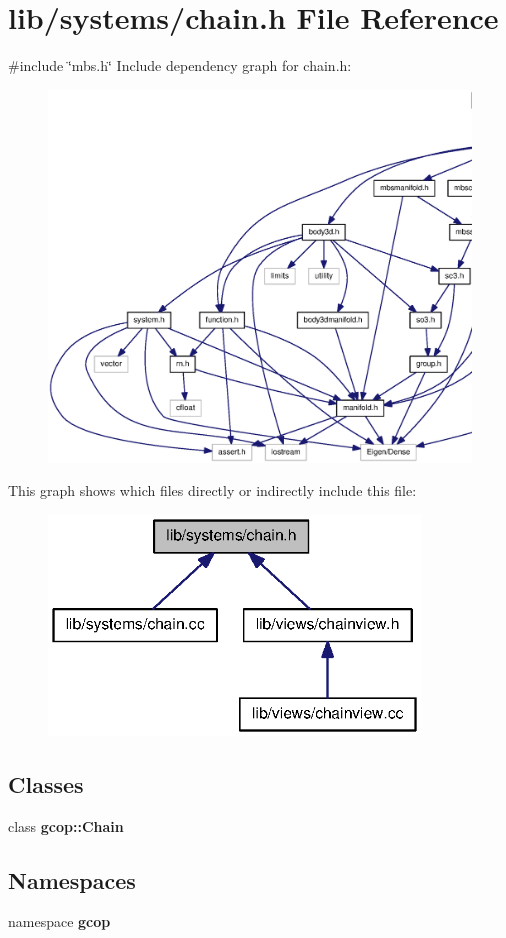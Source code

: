 \section{lib/systems/chain.h \-File \-Reference}
\label{chain_8h}
{\ttfamily \#include \char`\"{}mbs.\-h\char`\"{}}\*
\-Include dependency graph for chain.\-h\-:\nopagebreak
\begin{figure}[H]
\begin{center}
\leavevmode
\includegraphics[width=350pt]{chain_8h__incl}
\end{center}
\end{figure}
\-This graph shows which files directly or indirectly include this file\-:\nopagebreak
\begin{figure}[H]
\begin{center}
\leavevmode
\includegraphics[width=280pt]{chain_8h__dep__incl}
\end{center}
\end{figure}
\subsection*{\-Classes}
\begin{DoxyCompactItemize}
\item 
class {\bf gcop\-::\-Chain}
\end{DoxyCompactItemize}
\subsection*{\-Namespaces}
\begin{DoxyCompactItemize}
\item 
namespace {\bf gcop}
\end{DoxyCompactItemize}
